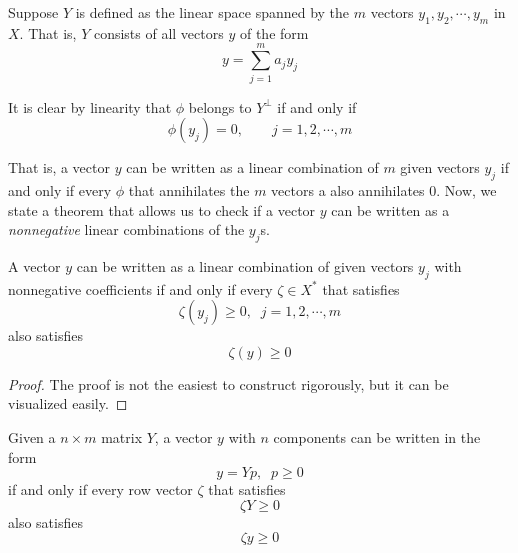   Suppose $Y$ is defined as the linear space spanned by the $m$ vectors $y_1, y_2, \cdots, y_m$ in $X$. That is, $Y$ consists of all vectors $y$ of the form
  \begin{equation}
    y = \sum_{j=1}^m a_j y_j
  \end{equation}

  It is clear by linearity that $\phi$ belongs to $Y^\perp$ if and only if
  \begin{equation}
    \phi (y_j) = 0, \qquad j = 1, 2, \cdots, m
  \end{equation}

  That is, a vector $y$ can be written as a linear combination of $m$ given vectors $y_j$ if and only if every $\phi$ that annihilates the $m$ vectors a also annihilates $0$. Now, we state a theorem that allows us to check if a vector $y$ can be written as a \textit{nonnegative} linear combinations of the $y_j$s. 

  \begin{theorem}
    A vector $y$ can be written as a linear combination of given vectors $y_j$ with nonnegative coefficients if and only if every $\zeta \in X^\ast$ that satisfies 
    \begin{equation}
       \zeta (y_j) \geq 0, \;\; j = 1, 2, \cdots, m
    \end{equation}
    also satisfies 
    \begin{equation}
      \zeta (y) \geq 0
    \end{equation}
  \end{theorem}
  \begin{proof}
    The proof is not the easiest to construct rigorously, but it can be visualized easily. 
  \end{proof}

  \begin{corollary}
    Given a $n \times m$ matrix $Y$, a vector $y$ with $n$ components can be written in the form 
    \begin{equation}
      y = Y p, \;\; p \geq 0
    \end{equation}
    if and only if every row vector $\zeta$ that satisfies 
    \begin{equation}
      \zeta Y \geq 0
    \end{equation}
    also satisfies 
    \begin{equation}
      \zeta y \geq 0
    \end{equation}
  \end{corollary}

